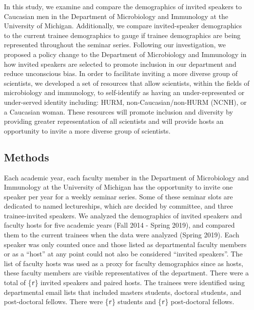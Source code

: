 \documentclass[10pt,]{article}
\begin{document}
In this study, we examine and compare the demographics of invited
speakers to Caucasian men in the Department of Microbiology and
Immunology at the University of Michigan. Additionally, we compare
invited-speaker demographics to the current trainee demographics to
gauge if trainee demographics are being represented throughout the
seminar series. Following our investigation, we proposed a policy change
to the Department of Microbiology and Immunology in how invited speakers
are selected to promote inclusion in our department and reduce
unconscious bias. In order to facilitate inviting a more diverse group
of scientists, we developed a set of resources that allow scientists,
within the fields of microbiology and immunology, to self-identify as
having an under-represented or under-served identity including: HURM,
non-Caucasian/non-HURM (NCNH), or a Caucasian woman. These resources
will promote inclusion and diversity by providing greater representation
of all scientists and will provide hosts an opportunity to invite a more
diverse group of scientists.

\subsection{Methods}\label{methods}

Each academic year, each faculty member in the Department of
Microbiology and Immunology at the University of Michigan has the
opportunity to invite one speaker per year for a weekly seminar series.
Some of these seminar slots are dedicated to named lectureships, which
are decided by committee, and three trainee-invited speakers. We
analyzed the demographics of invited speakers and faculty hosts for five
academic years (Fall 2014 - Spring 2019), and compared them to the
current trainees when the data were analyzed (Spring 2019). Each speaker
was only counted once and those listed as departmental faculty members
or as a ``host'' at any point could not also be considered ``invited
speakers''. The list of faculty hosts was used as a proxy for faculty
demographics since as hosts, these faculty members are visible
representatives of the department. There were a total of \{\texttt{r}\}
invited speakers and paired hosts. The trainees were identified using
departmental email lists that included masters students, doctoral
students, and post-doctoral fellows. There were \{\texttt{r}\} students
and \{\texttt{r}\} post-doctoral fellows.
\end{document}
